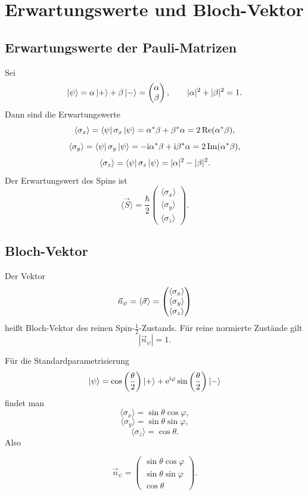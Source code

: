 \section{Erwartungswerte und Bloch-Vektor}

\subsection{Erwartungswerte der Pauli-Matrizen}

Sei
\[
    \left|\psi\right\rangle=\alpha\left|+\right\rangle+\beta\left|-\right\rangle
    =
    \begin{pmatrix}
        \alpha\\\beta
    \end{pmatrix},
    \qquad |\alpha|^2+|\beta|^2=1.
\]
Dann sind die Erwartungswerte
\[
    \langle\sigma_x\rangle
    =\left\langle\psi\right|\sigma_x\left|\psi\right\rangle
    =\alpha^*\beta+\beta^*\alpha
    =2\operatorname{Re}(\alpha^*\beta),
\]
\[
    \langle\sigma_y\rangle
    =\left\langle\psi\right|\sigma_y\left|\psi\right\rangle
    =-\mathrm{i}\alpha^*\beta+\mathrm{i}\beta^*\alpha
    =2\operatorname{Im}(\alpha^*\beta),
\]
\[
    \langle\sigma_z\rangle
    =\left\langle\psi\right|\sigma_z\left|\psi\right\rangle
    =|\alpha|^2-|\beta|^2.
\]
Der Erwartungswert des Spins ist
\[
    \langle\vec S\rangle
    =\frac{\hbar}{2}
    \begin{pmatrix}
        \langle\sigma_x\rangle\\
        \langle\sigma_y\rangle\\
        \langle\sigma_z\rangle
    \end{pmatrix}.
\]

\subsection{Bloch-Vektor}

Der Vektor
\[
    \vec n_\psi=\langle\vec\sigma\rangle
    =
    \begin{pmatrix}
        \langle\sigma_x\rangle\\
        \langle\sigma_y\rangle\\
        \langle\sigma_z\rangle
    \end{pmatrix}
\]
heißt Bloch-Vektor des reinen Spin-\(\frac12\)-Zustands. Für reine normierte Zustände gilt
\[
    |\vec n_\psi|=1.
\]

Für die Standardparametrisierung
\[
    \left|\psi\right\rangle
    =\cos\left(\frac{\theta}{2}\right)\left|+\right\rangle
    +\mathrm{e}^{\mathrm{i}\varphi}\sin\left(\frac{\theta}{2}\right)\left|-\right\rangle
\]
findet man
\[
    \langle\sigma_x\rangle=\sin\theta\cos\varphi,
\]
\[
    \langle\sigma_y\rangle=\sin\theta\sin\varphi,
\]
\[
    \langle\sigma_z\rangle=\cos\theta.
\]
Also
\begin{formulabox}
\[
    \vec n_\psi
    =
    \begin{pmatrix}
        \sin\theta\cos\varphi\\
        \sin\theta\sin\varphi\\
        \cos\theta
    \end{pmatrix}.
\]
\end{formulabox}

